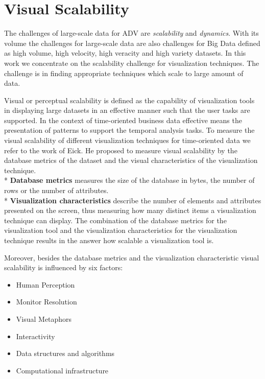 \section{Visual Scalability}
 The challenges of large-scale data for ADV are \textit{scalability} and \textit{dynamics}\cite{Wang2015}. With its volume the challenges for large-scale data are also challenges for Big Data defined as high volume, high velocity, high veracity and high variety datasets\cite{Wang2015}. In this work we concentrate on the scalability challenge for visualization techniques. The challenge is in finding appropriate techniques\cite{Aigner2008,Keim2005} which scale to large amount of data.
 
Visual or perceptual scalability is defined as the capability of visualization tools in displaying large datasets in an effective manner\cite{Eick2002} such that the user tasks are supported. In the context of time-oriented business data effective means the presentation of patterns to support the temporal analysis tasks. To measure the visual scalability of different visualization techniques for time-oriented data we refer to the work of Eick\cite{Eick2002}. He proposed to measure visual scalability by the database metrics of the dataset and the visual characteristics of the visualization technique.\\*
\textbf{Database metrics} measures the size of the database in bytes, the number of rows or the number of attributes. \\*
\textbf{Visualization characteristics} describe the number of elements and attributes presented on the screen, thus measuring how many distinct items a visualization technique can display.
The combination of the database metrics for the visualization tool and the visualization characteristics for the visualization technique results in the answer how scalable a visualization tool is.

Moreover, besides the database metrics and the visualization characteristic visual scalability is influenced by six factors: 
\begin{itemize}
    \item Human Perception\cite{Keim2005,Deering1998}
    \item Monitor Resolution 
    \item Visual Metaphors
    \item Interactivity
    \item Data structures and algorithms
    \item Computational infrastructure
\end{itemize}

